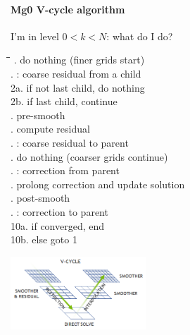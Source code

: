 %
\begin{frame}[fragile,label=ss-recent-gravity] 
\secframetitle{\ssRecentGravity}
\framesubtitle{Mg0 V-cycle algorithm}
%
 I'm in level $0 < k < N$: what do I do?
 \begin{minipage}{2.5in}
\footnotesize
\vspace{0.1in}
\begin{tabbing}
\=\=\=\kill
{}. do nothing (finer grids start) \\
. : coarse residual from a child \\
\>\>	    2a. if not last child, do nothing \\
\>\>           2b. if last child, continue \\
. pre-smooth \\
. compute residual \\
. : coarse residual to parent \\
. do nothing (coarser grids continue) \\
. : correction from parent \\
. prolong correction and update solution \\
. post-smooth \\
. : correction to parent \\
\>\>           10a. if converged, end \\
\>\>	    10b. else goto 1
\end{tabbing}
\end{minipage}
\begin{minipage}{1.9in}
\centerline{\includegraphics[width=2.0in]{hpgmg_v_cycle.png}}
\end{minipage}
\end{frame}
%
